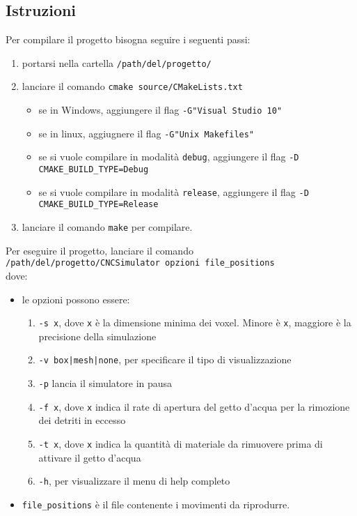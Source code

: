 \documentclass[10pt,a4paper,twoside,openright,titlepage,fleqn,%
               headinclude,,footinclude,BCOR5mm,%
               numbers=noenddot,cleardoublepage=empty,%
               tablecaptionabove]{scrreprt}
\begin{document}
\subsection{Istruzioni}
Per compilare il progetto bisogna seguire i seguenti passi:
\begin{enumerate}
  \item portarsi nella cartella \verb!/path/del/progetto/!
  \item lanciare il comando \verb!cmake source/CMakeLists.txt!
    \begin{itemize}[noitemsep]
      \item se in Windows, aggiungere il flag \verb!-G"Visual Studio 10"!
      \item se in linux, aggiugnere il flag \verb!-G"Unix Makefiles"!
    \end{itemize}
    \begin{itemize}[noitemsep]
      \item se si vuole compilare in modalità \verb!debug!, aggiungere il flag \verb!-D CMAKE_BUILD_TYPE=Debug!
      \item se si vuole compilare in modalità \verb!release!, aggiungere il flag \verb!-D CMAKE_BUILD_TYPE=Release!
    \end{itemize}
  \item lanciare il comando \verb!make! per compilare.
\end{enumerate}

Per eseguire il progetto, lanciare il comando\\ \verb!/path/del/progetto/CNCSimulator opzioni file_positions!\\ dove:
\begin{itemize}
  \item le opzioni possono essere:
    \begin{enumerate}[noitemsep]
      \item \verb!-s x!, dove \verb!x! è la dimensione minima dei voxel. Minore è \verb!x!, maggiore è la precisione della simulazione
      \item \verb!-v box|mesh|none!, per specificare il tipo di visualizzazione
      \item \verb!-p! lancia il simulatore in pausa
      \item \verb!-f x!, dove \verb!x! indica il rate di apertura del getto d'acqua per la rimozione dei detriti in eccesso
      \item \verb!-t x!, dove \verb!x! indica la quantità di materiale da rimuovere prima di attivare il getto d'acqua
      \item \verb!-h!, per visualizzare il menu di help completo
    \end{enumerate}
  \item \verb!file_positions! è il file contenente i movimenti da riprodurre.
\end{itemize}
\end{document}
